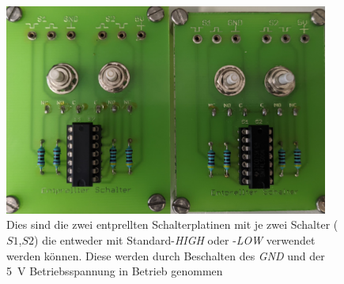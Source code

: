 \documentclass[12pt,english,ngerman]{scrartcl}
\begin{document}
\begin{figure}[H]
  \centering
  \includegraphics[width=0.95\textwidth]{./figures/messungen/schalter.jpg}
  \caption{Dies sind die zwei entprellten Schalterplatinen mit je zwei Schalter
    ($S1$,$S2$) die entweder mit Standard-\textit{HIGH} oder -\textit{LOW} verwendet
    werden können. Diese werden durch Beschalten des \textit{GND} und der \SI{5}{\volt}
    Betriebsspannung in Betrieb genommen}
  \label{fig:aufbau_schalter}
\end{figure}



\end{document}
